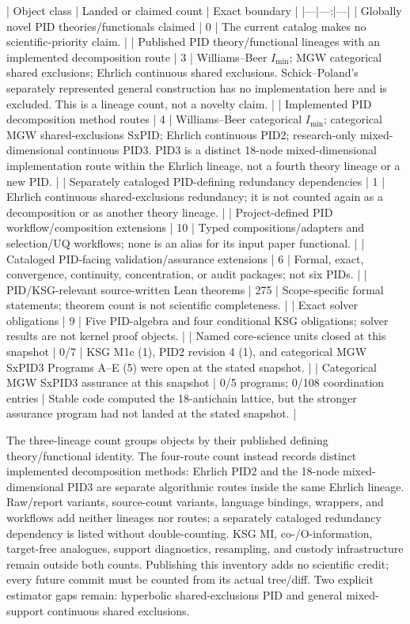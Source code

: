 \documentclass[11pt]{article}
\begin{document}
\begin{markdown}
| Object class | Landed or claimed count | Exact boundary |
|---|---:|---|
| Globally novel PID theories/functionals claimed | 0 | The current catalog makes no scientific-priority claim. |
| Published PID theory/functional lineages with an implemented decomposition route | 3 | Williams--Beer $I_{\min}$; MGW categorical shared exclusions; Ehrlich continuous shared exclusions. Schick--Poland's separately represented general construction has no implementation here and is excluded. This is a lineage count, not a novelty claim. |
| Implemented PID decomposition method routes | 4 | Williams--Beer categorical $I_{\min}$; categorical MGW shared-exclusions SxPID; Ehrlich continuous PID2; research-only mixed-dimensional continuous PID3. PID3 is a distinct 18-node mixed-dimensional implementation route within the Ehrlich lineage, not a fourth theory lineage or a new PID. |
| Separately cataloged PID-defining redundancy dependencies | 1 | Ehrlich continuous shared-exclusions redundancy; it is not counted again as a decomposition or as another theory lineage. |
| Project-defined PID workflow/composition extensions | 10 | Typed compositions/adapters and selection/UQ workflows; none is an alias for its input paper functional. |
| Cataloged PID-facing validation/assurance extensions | 6 | Formal, exact, convergence, continuity, concentration, or audit packages; not six PIDs. |
| PID/KSG-relevant source-written Lean theorems | 275 | Scope-specific formal statements; theorem count is not scientific completeness. |
| Exact solver obligations | 9 | Five PID-algebra and four conditional KSG obligations; solver results are not kernel proof objects. |
| Named core-science units closed at this snapshot | 0/7 | KSG M1c (1), PID2 revision 4 (1), and categorical MGW SxPID3 Programs A--E (5) were open at the stated snapshot. |
| Categorical MGW SxPID3 assurance at this snapshot | 0/5 programs; 0/108 coordination entries | Stable code computed the 18-antichain lattice, but the stronger assurance program had not landed at the stated snapshot. |

The three-lineage count groups objects by their published defining theory/functional identity. The
four-route count instead records distinct implemented decomposition methods: Ehrlich PID2 and the
18-node mixed-dimensional PID3 are separate algorithmic routes inside the same Ehrlich lineage.
Raw/report variants, source-count variants, language bindings, wrappers, and workflows add neither
lineages nor routes; a separately cataloged redundancy dependency is listed without double-counting.
KSG MI, co-/O-information, target-free analogues, support diagnostics, resampling, and custody
infrastructure remain outside both counts. Publishing this inventory adds no scientific
credit; every future commit must be counted from its actual tree/diff. Two explicit estimator gaps
remain: hyperbolic shared-exclusions PID and general mixed-support continuous shared exclusions.


\end{markdown}
\end{document}
